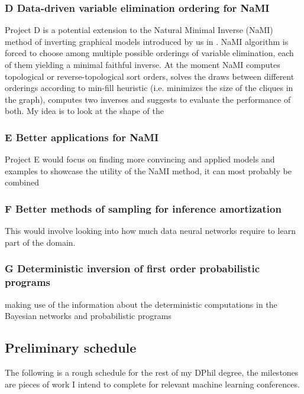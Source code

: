 \documentclass[12pt]{article}
\begin{document}
\subsubsection*{D \quad Data-driven variable elimination ordering for NaMI}
Project D is a potential extension to the Natural Minimal Inverse (NaMI) method of inverting graphical models introduced by us in \citep{golinski2018uai}.
NaMI algorithm is forced to choose among multiple possible orderings of variable elimination, each of them yielding a minimal faithful inverse.
At the moment NaMI computes topological or reverse-topological sort orders, solves the draws between different orderings according to min-fill heuristic (i.e. minimizes the size of the cliques in the graph), computes two inverses and suggests to evaluate the performance of both.
My idea is to look at the shape of the 


\subsubsection*{E \quad Better applications for NaMI}
Project E would focus on finding more convincing and applied models and examples to showcase the utility of the NaMI method, it can most probably be combined  


\subsubsection*{F \quad Better methods of sampling for inference amortization}
This would involve looking into how much data neural networks require to learn part of the domain.


\subsubsection*{G \quad Deterministic inversion of first order probabilistic programs}
making use of the information about the deterministic computations in the Bayesian networks and probabilistic programs\\




\subsection{Preliminary schedule}

The following is a rough schedule for the rest of my DPhil degree, the milestones are pieces of work I intend to complete for relevant machine learning conferences.
\end{document}
